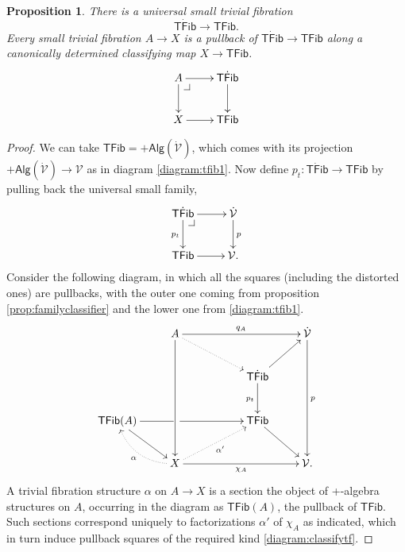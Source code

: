 \documentclass[11pt]{article}
\makeatletter
\newcommand{\pbcorner}[1][dr]{\save*!/#1-1.2pc/#1:(-1,1)@^{|-}\restore}
\newcommand{\ra}{\ensuremath{\rightarrow}}
\newcommand{\V}{\ensuremath{\mathcal{V}}}
\newcommand{\VV}{\ensuremath{\dot{\mathcal{V}}}}
\newcommand{\TFib}{\ensuremath{\mathsf{TFib}}}
\newcommand{\TTFib}{\ensuremath{\dot{\mathsf{TFib}}}}
\newtheorem{proposition}[theorem]{Proposition}
\theoremstyle{remark}
\theoremstyle{definition}
\makeatother
\begin{document}
\begin{proposition}\label{prop:classtrivfib}
There is a \emph{universal small trivial fibration}  $$\TTFib\ra\TFib.$$  Every small trivial fibration $A \ra X$ is a pullback of $\TTFib\ra\TFib$ along a canonically determined classifying map $X\ra \TFib$.
\begin{equation}\label{diagram:classifytf}
\xymatrix{
A \ar[d] \ar[r]  \pbcorner & \TTFib\ar[d]\\
X \ar[r] & \TFib
}
\end{equation}
\end{proposition}

\begin{proof}
We can take $\TFib = +\mathsf{Alg}(\VV) $, which comes with its projection $+\mathsf{Alg}(\VV) \ra \V$ as in diagram \eqref{diagram:tfib1}.  Now define $p_t:\TTFib\ra\TFib$ by pulling back the universal small family,
\[
\xymatrix{
\TTFib \ar[d]_{p_t} \ar[r]  \pbcorner & \VV\ar[d]^p\\
\TFib \ar[r] & \V.
}
\]
Consider the following diagram, in which all the squares (including the distorted ones) are pullbacks, with the outer one coming from proposition \ref{prop:familyclassifier} and the lower one from \eqref{diagram:tfib1}.
\begin{equation}\label{diagram:classifytf2}
\xymatrix{
&A \ar[ddd] \ar[rrr]^{q_A}   \ar@{.>}[rrd] &&& \VV\ar[ddd]^p\\
& && \TTFib \ar[d]_{p_t} \ar[ru]  &\\
\TFib(A) \ar[rd] \ar[rrr] |<<<<<<<<<<<<\hole  &&& \TFib \ar[rd] &\\
&X \ar[rrr]_{\chi_A} \ar@{.>}@/^1pc/[lu]^\alpha \ar@{.>}[rru]_{\alpha'} &&& \V.
}
\end{equation}
A trivial fibration structure $\alpha$ on $A\ra X$ is a section the object of +-algebra structures on $A$, occurring in the diagram as $\TFib(A)$, the pullback of $\TFib$.  Such sections correspond uniquely to factorizations $\alpha'$ of $\chi_A$ as indicated, which in turn induce pullback squares of the required kind \eqref{diagram:classifytf}.
\end{proof}
\end{document}
